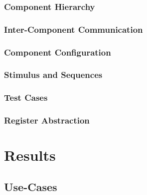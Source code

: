 \documentclass[11pt,a4paper]{report}
\begin{document}
\subsection{Component Hierarchy} %

\subsection{Inter-Component Communication} %

\subsection{Component Configuration} %

\subsection{Stimulus and Sequences} %

\subsection{Test Cases} %

\subsection{Register Abstraction} %

\chapter{Results} %

\section{Use-Cases} %
\end{document}
